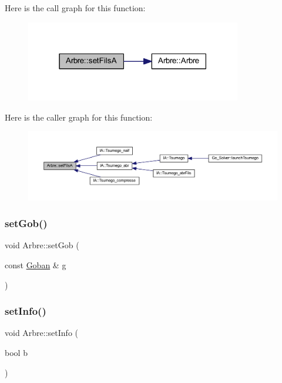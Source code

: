 Here is the call graph for this function\+:
\nopagebreak
\begin{figure}[H]
\begin{center}
\leavevmode
\includegraphics[width=267pt]{class_arbre_aceca304216a7f620926c2147c7c84acd_cgraph}
\end{center}
\end{figure}
Here is the caller graph for this function\+:
\nopagebreak
\begin{figure}[H]
\begin{center}
\leavevmode
\includegraphics[width=350pt]{class_arbre_aceca304216a7f620926c2147c7c84acd_icgraph}
\end{center}
\end{figure}
\mbox{\label{class_arbre_a9e445e308cc393f7ff3e6076b461608a}} 
\subsubsection{\texorpdfstring{set\+Gob()}{setGob()}}
{\footnotesize\ttfamily void Arbre\+::set\+Gob (\begin{DoxyParamCaption}\item[{const \hyperlink{class_goban}{Goban} \&}]{g }\end{DoxyParamCaption})}

\mbox{\label{class_arbre_a051e5328c63ba7ab6f6359f9f2f77105}} 
\subsubsection{\texorpdfstring{set\+Info()}{setInfo()}}
{\footnotesize\ttfamily void Arbre\+::set\+Info (\begin{DoxyParamCaption}\item[{bool}]{b }\end{DoxyParamCaption})}


